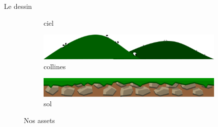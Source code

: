 \documentclass[t,12pt]{beamer}
\begin{document}
\begin{frame}{Le dessin}
\begin{figure}
\begin{subfigure}[b]{0.2\textwidth}
         \caption{ciel}
         \label{fig:ciel}
     \end{subfigure}
     \hfill
     \begin{subfigure}[b]{0.2\textwidth}
         \centering
         \includegraphics[width=\textwidth]{collines}
         \caption{collines}
         \label{fig:collines}
     \end{subfigure}
     \hfill
     \begin{subfigure}[b]{0.2\textwidth}
         \centering
         \includegraphics[width=\textwidth]{sol}
         \caption{sol}
         \label{fig:sol}
     \end{subfigure}
     \caption{Nos assets}
     \label{fig:three graphs}
    \end{figure}
\end{frame}
\end{document}
